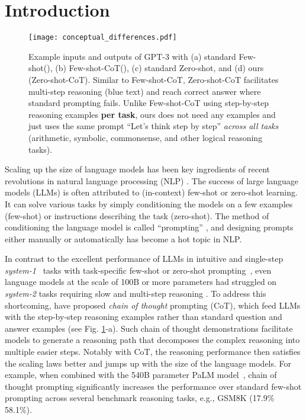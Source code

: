 \documentclass{article}
\newcommand{\CoT}{chain of thought\xspace}
\newcommand{\ours}{Zero-shot-CoT\xspace}
\newcommand{\theirs}{Few-shot-CoT\xspace}
\newcommand{\theirsz}{Zero-shot\xspace}
\newcommand{\theirsf}{Few-shot\xspace}
\begin{document}
\section{Introduction}


\begin{figure}[t]
  \begin{center}
\texttt{[image: conceptual\_differences.pdf]}
  \end{center}
  \caption{Example inputs and outputs of GPT-3 with (a) standard \theirsf (\citep{brown2020language}), (b) \theirs (\citep{cot_wei}), (c) standard \theirsz, and (d) ours (\ours). 
  Similar to \theirs, \ours facilitates multi-step reasoning (blue text) and reach correct answer where standard prompting fails. 
  Unlike \theirs using step-by-step reasoning examples \textbf{per task}, ours does not need any examples and just uses the same prompt ``Let's think step by step'' \textit{across all tasks} (arithmetic, symbolic, commonsense, and other logical reasoning tasks).
}
  \label{fig_overview_1}
\end{figure}

Scaling up the size of language models has been key ingredients of recent revolutions in natural language processing (NLP) \citep{transformer, bert, t5, brown2020language, lamda, gopher, palm}. 
The success of large language models (LLMs) is often attributed to (in-context) few-shot or zero-shot learning. It can solve various tasks by simply conditioning the models on a few examples (few-shot) or instructions describing the task (zero-shot). 
The method of conditioning the language model is called ``prompting'' \citep{liu2021pre}, and designing prompts either manually \citep{schick2020s,prompt1} or automatically \citep{gao2021making,shin2020autoprompt} has become a hot topic in NLP. 

In contrast to the excellent performance of LLMs in intuitive and single-step \textit{system-1}~\citep{stanovich2000individual} tasks with task-specific few-shot or zero-shot prompting~\citep{liu2021pre}, even language models at the scale of 100B or more parameters had struggled on \textit{system-2} tasks requiring slow and multi-step reasoning \citep{gopher}. 
To address this shortcoming, \citet{cot_wei, cot_wei_sc} have proposed \textit{\CoT} prompting (CoT), which feed LLMs with the step-by-step reasoning examples rather than standard question and answer examples (see Fig. \ref{fig_overview_1}-a). 
Such \CoT demonstrations facilitate models to generate a reasoning path that decomposes the complex reasoning into multiple easier steps. 
Notably with CoT, the reasoning performance then satisfies the scaling laws better and jumps up with the size of the language models. For example, when combined with the 540B parameter PaLM model~\citep{palm}, \CoT prompting significantly increases the performance over standard few-shot prompting across several benchmark reasoning tasks, e.g., GSM8K (17.9\%  58.1\%). 
\end{document}
